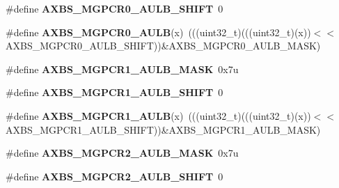 \begin{DoxyCompactItemize}
\item 
\#define {\bfseries A\+X\+B\+S\+\_\+\+M\+G\+P\+C\+R0\+\_\+\+A\+U\+L\+B\+\_\+\+S\+H\+I\+FT}~0\hypertarget{group__AXBS__Register__Masks_ga2c00c30d63906c765a6df81778e2fb4f}{}\label{group__AXBS__Register__Masks_ga2c00c30d63906c765a6df81778e2fb4f}

\item 
\#define {\bfseries A\+X\+B\+S\+\_\+\+M\+G\+P\+C\+R0\+\_\+\+A\+U\+LB}(x)~(((uint32\+\_\+t)(((uint32\+\_\+t)(x))$<$$<$A\+X\+B\+S\+\_\+\+M\+G\+P\+C\+R0\+\_\+\+A\+U\+L\+B\+\_\+\+S\+H\+I\+FT))\&A\+X\+B\+S\+\_\+\+M\+G\+P\+C\+R0\+\_\+\+A\+U\+L\+B\+\_\+\+M\+A\+SK)\hypertarget{group__AXBS__Register__Masks_ga1a52b7004338c3caf87bc34f75bab14b}{}\label{group__AXBS__Register__Masks_ga1a52b7004338c3caf87bc34f75bab14b}

\item 
\#define {\bfseries A\+X\+B\+S\+\_\+\+M\+G\+P\+C\+R1\+\_\+\+A\+U\+L\+B\+\_\+\+M\+A\+SK}~0x7u\hypertarget{group__AXBS__Register__Masks_gaefd2ffd8d80f4eb9fd14f3c5a3a7b629}{}\label{group__AXBS__Register__Masks_gaefd2ffd8d80f4eb9fd14f3c5a3a7b629}

\item 
\#define {\bfseries A\+X\+B\+S\+\_\+\+M\+G\+P\+C\+R1\+\_\+\+A\+U\+L\+B\+\_\+\+S\+H\+I\+FT}~0\hypertarget{group__AXBS__Register__Masks_gab45b6c2302bbf061fd1c43d436659bd7}{}\label{group__AXBS__Register__Masks_gab45b6c2302bbf061fd1c43d436659bd7}

\item 
\#define {\bfseries A\+X\+B\+S\+\_\+\+M\+G\+P\+C\+R1\+\_\+\+A\+U\+LB}(x)~(((uint32\+\_\+t)(((uint32\+\_\+t)(x))$<$$<$A\+X\+B\+S\+\_\+\+M\+G\+P\+C\+R1\+\_\+\+A\+U\+L\+B\+\_\+\+S\+H\+I\+FT))\&A\+X\+B\+S\+\_\+\+M\+G\+P\+C\+R1\+\_\+\+A\+U\+L\+B\+\_\+\+M\+A\+SK)\hypertarget{group__AXBS__Register__Masks_ga80c64ff55917829c1d7c876966469c92}{}\label{group__AXBS__Register__Masks_ga80c64ff55917829c1d7c876966469c92}

\item 
\#define {\bfseries A\+X\+B\+S\+\_\+\+M\+G\+P\+C\+R2\+\_\+\+A\+U\+L\+B\+\_\+\+M\+A\+SK}~0x7u\hypertarget{group__AXBS__Register__Masks_ga454fa34b9ad3a689e961506a253e3775}{}\label{group__AXBS__Register__Masks_ga454fa34b9ad3a689e961506a253e3775}

\item 
\#define {\bfseries A\+X\+B\+S\+\_\+\+M\+G\+P\+C\+R2\+\_\+\+A\+U\+L\+B\+\_\+\+S\+H\+I\+FT}~0\hypertarget{group__AXBS__Register__Masks_ga0e4aa4214fd104e88a02473e0bf30c7f}{}\label{group__AXBS__Register__Masks_ga0e4aa4214fd104e88a02473e0bf30c7f}


\end{DoxyCompactItemize}
